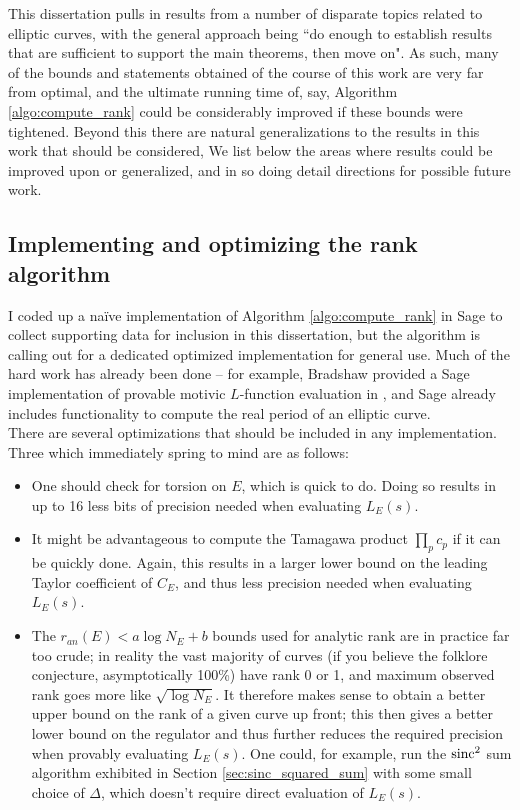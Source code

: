 
This dissertation pulls in results from a number of disparate topics related to elliptic curves, with the general approach being ``do enough to establish results that are sufficient to support the main theorems, then move on". As such, many of the bounds and statements obtained of the course of this work are very far from optimal, and the ultimate running time of, say, Algorithm \ref{algo:compute_rank} could be considerably improved if these bounds were tightened. Beyond this there are natural generalizations to the results in this work that should be considered, We list below the areas where results could be improved upon or generalized, and in so doing detail directions for possible future work.

\subsection{Implementing and optimizing the rank algorithm}

I coded up a na\"{i}ve implementation of Algorithm \ref{algo:compute_rank} in Sage to collect supporting data for inclusion in this dissertation, but the algorithm is calling out for a dedicated optimized implementation for general use. Much of the hard work has already been done -- for example, Bradshaw provided a Sage implementation of provable motivic $L$-function evaluation in \cite{Bra-2010}, and Sage already includes functionality to compute the real period of an elliptic curve. \\

There are several optimizations that should be included in any implementation. Three which immediately spring to mind are as follows:
\begin{itemize}
\item One should check for torsion on $E$, which is quick to do. Doing so results in up to 16 less bits of precision needed when evaluating $L_E(s)$.
\item It might be advantageous to compute the Tamagawa product $\prod_p c_p$ if it can be quickly done. Again, this results in a larger lower bound on the leading Taylor coefficient of $C_E$, and thus less precision needed when evaluating $L_E(s)$.
\item The $r_{an}(E) < a\log N_E + b$ bounds used for analytic rank are in practice far too crude; in reality the vast majority of curves (if you believe the folklore conjecture, asymptotically 100\%) have rank 0 or 1, and maximum observed rank goes more like $\sqrt{\log N_E}$. It therefore makes sense to obtain a better upper bound on the rank of a given curve up front; this then gives a better lower bound on the regulator and thus further reduces the required precision when provably evaluating $L_E(s)$. One could, for example, run the $\operatorname{sinc}^2$ sum algorithm exhibited in Section \ref{sec:sinc_squared_sum} with some small choice of $\Delta$, which doesn't require direct evaluation of $L_E(s)$.
\end{itemize}

